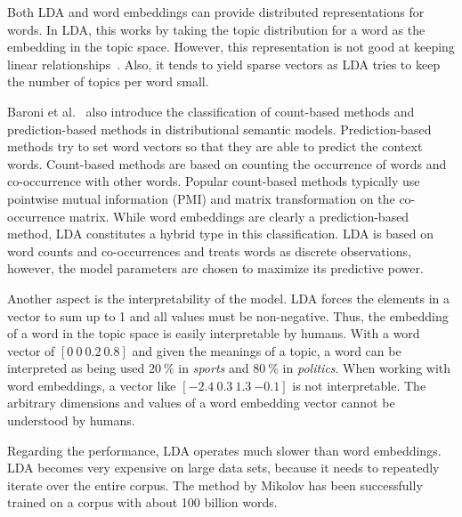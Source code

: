 \documentclass{sig-alternate-05-2015}
\begin{document}
Both LDA and word embeddings can provide distributed representations for words.
In LDA, this works by taking the topic distribution for a word as the embedding in the topic space.
However, this representation is not good at keeping linear relationships~\cite{Mikolov2013b,Mikolov2013a}.
Also, it tends to yield sparse vectors as LDA tries to keep the number of topics per word small.

Baroni et al.~\cite{Baroni2014} also introduce the classification of count-based methods and prediction-based methods in distributional semantic models.
Prediction-based methods try to set word vectors so that they are able to predict the context words.
Count-based methods are based on counting the occurrence of words and co-occurrence with other words.
Popular count-based methods typically use pointwise mutual information (PMI) and matrix transformation on the co-occurrence matrix.
While word embeddings are clearly a prediction-based method, LDA constitutes a hybrid type in this classification.
LDA is based on word counts and co-occurrences and treats words as discrete observations, however, the model parameters are chosen to maximize its predictive power.

Another aspect is the interpretability of the model.
LDA forces the elements in a vector to sum up to 1 and all values must be non-negative.
Thus, the embedding of a word in the topic space is easily interpretable by humans.
With a word vector of $[0~0~0.2~0.8]$ and given the meanings of a topic, a word can be interpreted as being used $20~\%$ in \emph{sports} and $80~\%$ in \emph{politics}.
When working with word embeddings, a vector like $[{-2.4}~0.3~1.3~{-0.1}]$ is not interpretable.
The arbitrary dimensions and values of a word embedding vector cannot be understood by humans.

Regarding the performance, LDA operates much slower than word embeddings.
LDA becomes very expensive on large data sets, because it needs to repeatedly iterate over the entire corpus.
The method by Mikolov has been successfully trained on a corpus with about 100 billion words.

\end{document}
